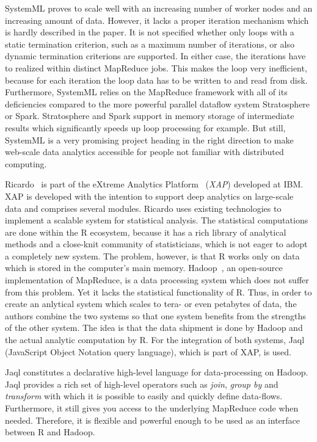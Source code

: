SystemML proves to scale well with an increasing number of worker nodes and an increasing amount of data.
However, it lacks a proper iteration mechanism which is hardly described in the paper.
It is not specified whether only loops with a static termination criterion, such as a maximum number of iterations, or also dynamic termination criterions are supported.
In either case, the iterations have to realized within distinct MapReduce jobs.
This makes the loop very inefficient, because for each iteration the loop data has to be written to and read from disk.
Furthermore, SystemML relies on the MapReduce framework with all of its deficiencies compared to the more powerful parallel dataflow system Stratosphere or Spark.
Stratosphere and Spark support in memory storage of intermediate results which significantly speeds up loop processing for example.
But still, SystemML is a very promising project heading in the right direction to make web-scale data analytics accessible for people not familiar with distributed computing.

Ricardo~\cite{das:2010a} is part of the eXtreme Analytics Platform~\cite{balmin:jrd2013a} (\emph{XAP}) developed at IBM.
XAP is developed with the intention to support deep analytics on large-scale data and comprises several modules.
Ricardo uses existing technologies to implement a scalable system for statistical analysis.
The statistical computations are done within the R ecosystem, because it has a rich library of analytical methods and a close-knit community of statisticians, which is not eager to adopt a completely new system.
The problem, however, is that R works only on data which is stored in the computer's main memory.
Hadoop~\cite{hadoop:2008a}, an open-source implementation of MapReduce, is a data processing system which does not suffer from this problem.
Yet it lacks the statistical functionality of R.
Thus, in order to create an anlytical system which scales to tera- or even petabytes of data, the authors combine the two systems so that one system benefits from the strengths of the other system.
The idea is that the data shipment is done by Hadoop and the actual analytic computation by R.
For the integration of both systems, Jaql (JavaScript Object Notation query language), which is part of XAP, is used.

Jaql constitutes a declarative high-level language for data-processing on Hadoop.
Jaql provides a rich set of high-level operators such as \emph{join}, \emph{group by} and \emph{transform} with which it is possible to easily and quickly define data-flows.
Furthermore, it still gives you access to the underlying MapReduce code when needed.
Therefore, it is flexible and powerful enough to be used as an interface between R and Hadoop.


